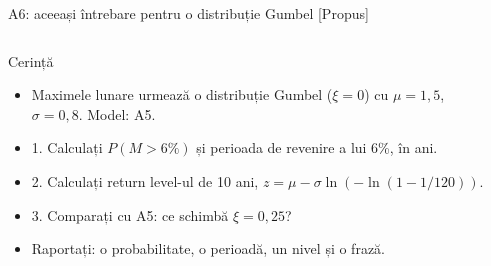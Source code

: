 \begin{frame}{A6: aceeași întrebare pentru o distribuție Gumbel [Propus]}
\propsub
\itemsize{\scriptsize}
\begin{columns}[T]
\begin{column}{\taskw}
\begin{block}{Cerință}
\begin{itemize}
    \item Maximele lunare urmează o distribuție Gumbel ($\xi = 0$) cu $\mu = 1{,}5$, $\sigma = 0{,}8$. Model: A5.
    \item 1. Calculați $P(M > 6\%)$ și perioada de revenire a lui 6\%, în ani.
    \item 2. Calculați return level-ul de 10 ani, $z = \mu - \sigma\ln(-\ln(1 - 1/120))$.
    \item 3. Comparați cu A5: ce schimbă $\xi = 0{,}25$?
    \item Raportați: o probabilitate, o perioadă, un nivel și o frază.
\end{itemize}
\end{block}
\end{column}
\begin{column}{\solw}
\end{column}
\end{columns}
\end{frame}


